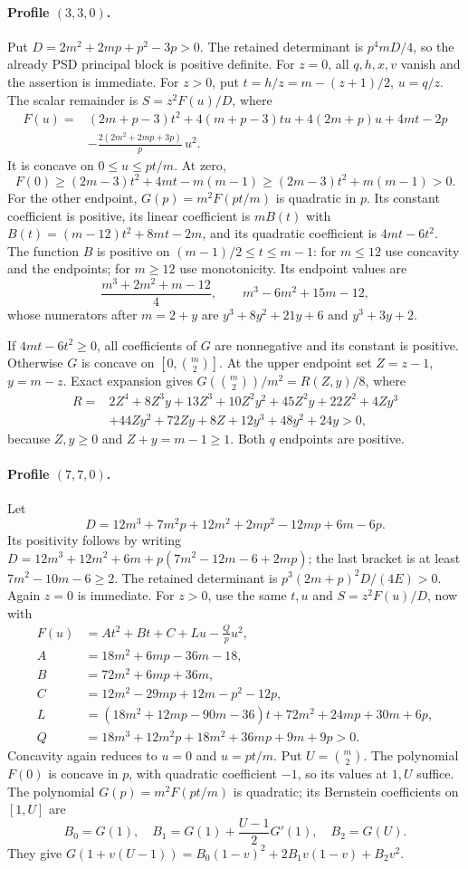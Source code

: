 \documentclass[11pt,a4paper]{article}
\theoremstyle{remark}\newtheorem{remark}[theorem]{Remark}
\begin{document}
\paragraph{Profile $(3,3,0)$.}
Put $D=2m^2+2mp+p^2-3p>0$. The retained determinant is
$p^4mD/4$, so the already PSD principal block is positive definite.
For $z=0$, all $q,h,x,v$ vanish and the assertion is immediate.
For $z>0$, put $t=h/z=m-(z+1)/2$, $u=q/z$.
The scalar remainder is $S=z^2F(u)/D$, where
\begin{align*}
 F(u)={}&(2m+p-3)t^2+4(m+p-3)tu+4(2m+p)u+4mt-2p\\
        &-\frac{2(2m^2+2mp+3p)}p\,u^2 .
\end{align*}
It is concave on $0\le u\le pt/m$. At zero,
\[
 F(0)\ge(2m-3)t^2+4mt-m(m-1)
       \ge(2m-3)t^2+m(m-1)>0.
\]
For the other endpoint, $G(p)=m^2F(pt/m)$ is quadratic in $p$.
Its constant coefficient is positive, its linear coefficient is
$mB(t)$ with
$B(t)=(m-12)t^2+8mt-2m$, and its quadratic coefficient is $4mt-6t^2$.
The function $B$ is positive on $(m-1)/2\le t\le m-1$:
for $m\le12$ use concavity and the endpoints; for $m\ge12$ use
monotonicity. Its endpoint values are
\[
 \frac{m^3+2m^2+m-12}{4},\qquad m^3-6m^2+15m-12,
\]
whose numerators after $m=2+y$ are $y^3+8y^2+21y+6$ and $y^3+3y+2$.

If $4mt-6t^2\ge0$, all coefficients of $G$ are nonnegative and its
constant is positive. Otherwise $G$ is concave on $[0,\binom m2]$.
At the upper endpoint set $Z=z-1$, $y=m-z$. Exact expansion gives
$G(\binom m2)/m^2=R(Z,y)/8$, where
\begin{align*}
 R={}&2Z^4+8Z^3y+13Z^3+10Z^2y^2+45Z^2y+22Z^2
       +4Zy^3\\
    &+44Zy^2+72Zy+8Z+12y^3+48y^2+24y>0,
\end{align*}
because $Z,y\ge0$ and $Z+y=m-1\ge1$. Both $q$ endpoints are positive.

\paragraph{Profile $(7,7,0)$.}
Let
\[
 D=12m^3+7m^2p+12m^2+2mp^2-12mp+6m-6p .
\]
Its positivity follows by writing
$D=12m^3+12m^2+6m+p(7m^2-12m-6+2mp)$; the last bracket is at least
$7m^2-10m-6\ge2$. The retained determinant is
$p^3(2m+p)^2D/(4E)>0$.
Again $z=0$ is immediate. For $z>0$, use the same $t,u$ and
$S=z^2F(u)/D$, now with
\begin{align*}
 F(u)&=At^2+Bt+C+Lu-\frac Qp u^2,\\
 A&=18m^2+6mp-36m-18,\\
 B&=72m^2+6mp+36m,\\
 C&=12m^2-29mp+12m-p^2-12p,\\
 L&=(18m^2+12mp-90m-36)t+72m^2+24mp+30m+6p,\\
 Q&=18m^3+12m^2p+18m^2+36mp+9m+9p>0.
\end{align*}
Concavity again reduces to $u=0$ and $u=pt/m$.
Put $U=\binom m2$. The polynomial $F(0)$ is concave in $p$, with
quadratic coefficient $-1$, so its values at $1,U$ suffice.
The polynomial $G(p)=m^2F(pt/m)$ is quadratic; its Bernstein coefficients
on $[1,U]$ are
\[
 B_0=G(1),\quad B_1=G(1)+\frac{U-1}{2}G'(1),\quad B_2=G(U).
\]
They give $G(1+v(U-1))=B_0(1-v)^2+2B_1v(1-v)+B_2v^2$.
\end{document}
